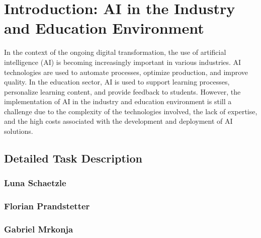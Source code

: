 \chapter{Introduction: AI in the Industry and Education Environment}
\label{chap:introduction}






In the context of the ongoing digital transformation, the use of artificial intelligence (AI) is becoming increasingly important in various industries.
AI technologies are used to automate processes, optimize production, and improve quality. 
In the education sector, AI is used to support learning processes, personalize learning content, and provide feedback to students. 
However, the implementation of AI in the industry and education environment is still a challenge due to the complexity of the technologies involved, 
the lack of expertise, and the high costs associated with the development and deployment of AI solutions.

\section{Detailed Task Description}

\subsection{Luna Schaetzle}

\subsection{Florian Prandstetter}

\subsection{Gabriel Mrkonja}

